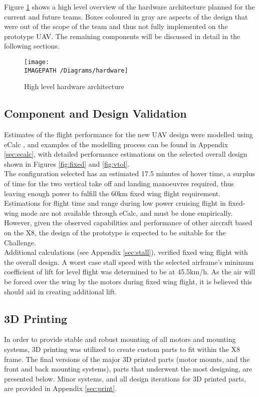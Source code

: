 Figure \ref{fig:hardwarearch} shows a high level overview of the hardware architecture planned for the current and future teams. Boxes coloured in gray are aspects of the design that were out of the scope of the \ID team and thus not fully implemented on the prototype UAV. The remaining components will be discussed in detail in the following sections.

\begin{figure}[!h]
	\centering
	\texttt{[image: \\IMAGEPATH /Diagrams/hardware]}
	\caption{High level hardware architecture}
	\label{fig:hardwarearch}
\end{figure}

\subsection{Component and Design Validation}
Estimates of the flight performance for the new UAV design were modelled using eCalc \cite{ref:ecalc}, and examples of the modelling process can be found in Appendix \ref{sec:ecalc}, with detailed performance estimations on the selected overall design shown in Figures \ref{fig:fixed} and \ref{fig:vtol}.\\

The configuration selected has an estimated 17.5 minutes of hover time, a surplus of time for the two vertical take off and landing manoeuvres required, thus leaving enough power to fulfill the 60km fixed wing flight requirement. Estimations for flight time and range during low power cruising flight in fixed-wing mode are not available through eCalc, and must be done empirically. However, given the observed capabilities and performance of other aircraft based on the X8, the design of the prototype is expected to be suitable for the Challenge.\\

Additional calculations (see Appendix \ref{sec:stall}), verified fixed wing flight with the overall design. A worst case stall speed with the selected airframe's minimum coefficient of lift for level flight was determined to be at 45.5km/h. As the air will be forced over the wing by the motors during fixed wing flight, it is believed this should aid in creating additional lift.

\subsection{3D Printing}
In order to provide stable and robust mounting of all motors and mounting systems, 3D printing was utilized to create custom parts to fit within the X8 frame. The final versions of the major 3D printed parts (motor mounts, and the front and back mounting systems), parts that underwent the most designing, are presented below. Minor systems, and all design iterations for 3D printed parts, are provided in Appendix \ref{sec:print}.

